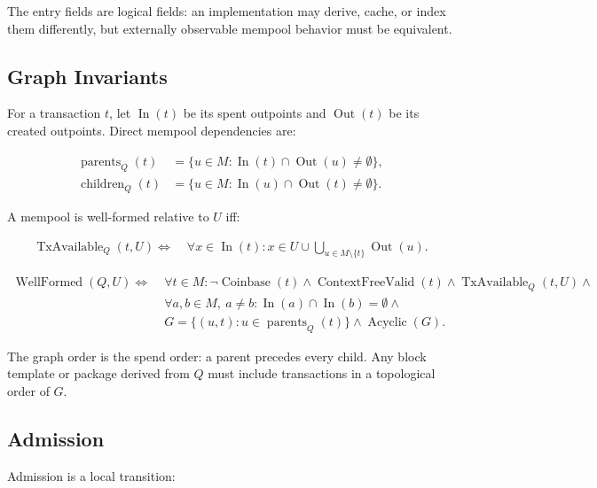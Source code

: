 The entry fields are logical fields: an implementation may derive, cache, or
index them differently, but externally observable mempool behavior must be
equivalent.

\subsection{Graph Invariants}

For a transaction \(t\), let \(\operatorname{In}(t)\) be its spent outpoints and
\(\operatorname{Out}(t)\) be its created outpoints. Direct mempool dependencies
are:

\[
\begin{aligned}
\operatorname{parents}_{Q}(t)
  &= \{u \in M : \operatorname{In}(t) \cap \operatorname{Out}(u) \ne \emptyset\},\\
\operatorname{children}_{Q}(t)
  &= \{u \in M : \operatorname{In}(u) \cap \operatorname{Out}(t) \ne \emptyset\}.
\end{aligned}
\]

A mempool is well-formed relative to \(U\) iff:

\[
\begin{aligned}
\operatorname{TxAvailable}_{Q}(t,U) \Longleftrightarrow\;&
  \forall x \in \operatorname{In}(t):
  x \in U \cup \bigcup_{u \in M \setminus \{t\}}\operatorname{Out}(u).
\end{aligned}
\]

\[
\begin{aligned}
\operatorname{WellFormed}(Q,U) \Longleftrightarrow\;&
  \forall t \in M:\neg\operatorname{Coinbase}(t) \wedge
  \operatorname{ContextFreeValid}(t) \wedge
  \operatorname{TxAvailable}_{Q}(t,U) \wedge \\
& \forall a,b \in M,\ a\ne b:
  \operatorname{In}(a) \cap \operatorname{In}(b)=\emptyset \wedge \\
& G=\{(u,t):u \in \operatorname{parents}_{Q}(t)\} \wedge
  \operatorname{Acyclic}(G).
\end{aligned}
\]

The graph order is the spend order: a parent precedes every child. Any block
template or package derived from \(Q\) must include transactions in a topological
order of \(G\).

\subsection{Admission}

Admission is a local transition:

